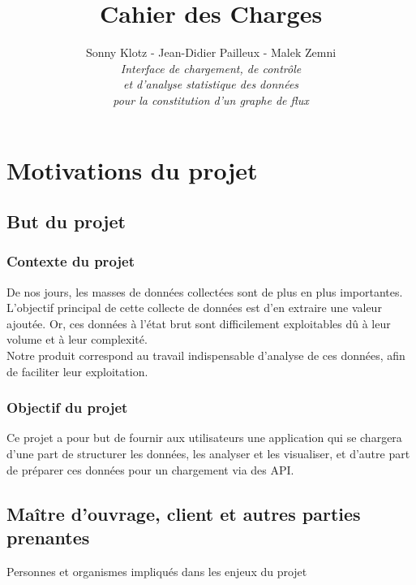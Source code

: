 

\title{\vspace{\fill}\textbf{\Huge Cahier des Charges}}
\author{Sonny Klotz - Jean-Didier Pailleux - Malek Zemni\vspace{2em}\\\textit{Interface de chargement, de contrôle}\\\textit{et d’analyse statistique des données}\\\textit{pour la constitution d’un graphe de flux}\vspace{2em}}


\maketitle\vspace{\fill}
\newpage
\tableofcontents
\newpage

	\section{Motivations du projet}
		\subsection{But du projet}
			\subsubsection{Contexte du projet}
			De nos jours, les masses de données collectées sont de plus en plus importantes. L'objectif principal de cette collecte de données est d'en extraire une valeur ajoutée. Or, ces données à l'état brut sont difficilement exploitables dû à leur volume et à leur complexité.\\
			Notre produit correspond au travail indispensable d'analyse de ces données, afin de faciliter leur exploitation.
			\subsubsection{Objectif du projet}
			Ce projet a pour but de fournir aux utilisateurs une application qui se chargera d'une part de structurer les données, les analyser et les visualiser, et d'autre part de préparer ces données pour un chargement via des API.
		
		
		\subsection{Maître d'ouvrage, client et autres parties prenantes}
			{\color{red}Personnes et organismes impliqués dans les enjeux du projet}
			
